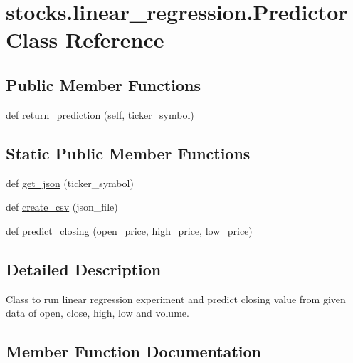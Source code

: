\hypertarget{classstocks_1_1linear__regression_1_1_predictor}{}\section{stocks.\+linear\+\_\+regression.\+Predictor Class Reference}
\label{classstocks_1_1linear__regression_1_1_predictor}
\subsection*{Public Member Functions}
\begin{DoxyCompactItemize}
\item 
def \mbox{\hyperlink{classstocks_1_1linear__regression_1_1_predictor_a87e63495df1ef8625b2321852477c34c}{return\+\_\+prediction}} (self, ticker\+\_\+symbol)
\end{DoxyCompactItemize}
\subsection*{Static Public Member Functions}
\begin{DoxyCompactItemize}
\item 
def \mbox{\hyperlink{classstocks_1_1linear__regression_1_1_predictor_a828b522dbfc376cb06d5e28a9baf3035}{get\+\_\+json}} (ticker\+\_\+symbol)
\item 
def \mbox{\hyperlink{classstocks_1_1linear__regression_1_1_predictor_aeee6845991ab04f14ce6a0541d7b2c6e}{create\+\_\+csv}} (json\+\_\+file)
\item 
def \mbox{\hyperlink{classstocks_1_1linear__regression_1_1_predictor_a5cd7db298bf453a953032e1458b5d17f}{predict\+\_\+closing}} (open\+\_\+price, high\+\_\+price, low\+\_\+price)
\end{DoxyCompactItemize}


\subsection{Detailed Description}
\begin{DoxyVerb}Class to run linear regression experiment and predict closing value from
given data of open, close, high, low and volume.
\end{DoxyVerb}
 

\subsection{Member Function Documentation}
\mbox{\label{classstocks_1_1linear__regression_1_1_predictor_aeee6845991ab04f14ce6a0541d7b2c6e}} 
